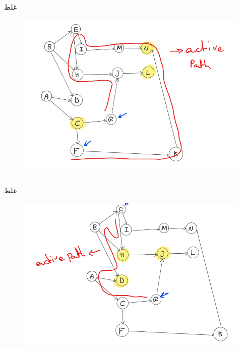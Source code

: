 \documentclass{university}
\begin{document}
\subsection{}
غلط
\begin{figure}[H]
    \centering
    \includegraphics[width=\textwidth]{assets/1c.png}
\end{figure}

\subsection{}
غلط
\begin{figure}[H]
    \centering
    \includegraphics[width=\textwidth]{assets/1d.png}
\end{figure}

\section{}
\end{document}

